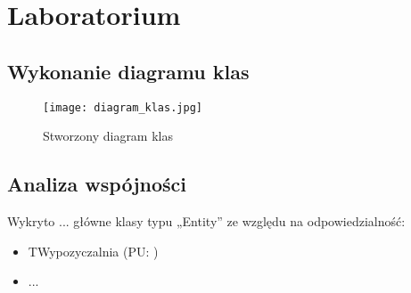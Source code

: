 \documentclass{article}
\begin{document}
	\section{Laboratorium}
	\subsection{Wykonanie diagramu klas}
\begin{figure}[!ht]
	\centering
	\texttt{[image: diagram\_klas.jpg]}
	\caption{Stworzony diagram klas}
	\label{fig:obrazek 1}
\end{figure}
	\newpage
	\subsection{Analiza wspójności}
	Wykryto ... główne klasy typu „Entity” ze względu na odpowiedzialność:
	\begin{itemize}
	\item TWypozyczalnia (PU: )
	\item ...
	\end{itemize}

		
	
\end{document}
